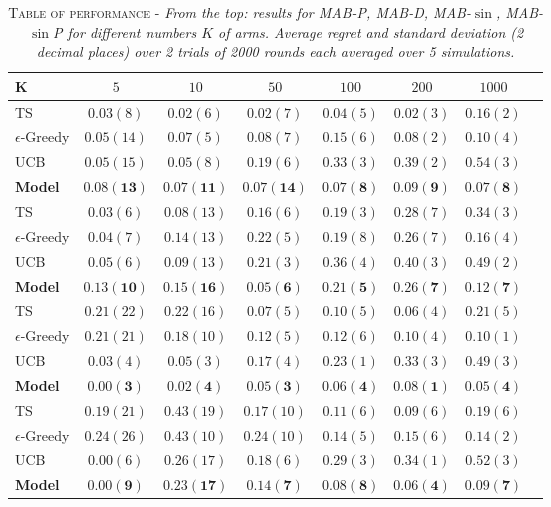 \begin{table}[ht]
\centering
\begin{tabular}{l c c c c c c c}
\toprule
\textbf{K} & \textbf{$5$} & \textbf{$10$} & \textbf{$50$} & \textbf{$100$} & \textbf{$200$} & \textbf{$1000$}\\
\midrule
TS & $0.03(8)$ & $0.02(6)$ & $0.02(7)$ & $0.04(5)$ & $0.02(3)$ & $0.16(2)$ \\
$\epsilon$-Greedy & $0.05(14)$ & $0.07(5)$ & $0.08(7)$ & $0.15(6)$ & $0.08(2)$ & $0.10(4)$ \\
UCB & $0.05(15)$ & $0.05(8)$ & $0.19(6)$ & $0.33(3)$ & $0.39(2)$ & $0.54(3)$ \\
\textbf{Model} & $\mathbf{0.08(13)}$ & $\mathbf{0.07(11)}$ & $\mathbf{0.07(14)}$ & $\mathbf{0.07(8)}$ & $\mathbf{0.09(9)}$ & $\mathbf{0.07(8)}$ \\

\midrule
TS & $0.03(6)$ & $0.08(13)$ & $0.16(6)$ & $0.19(3)$ & $0.28(7)$ & $0.34(3)$ \\
$\epsilon$-Greedy & $0.04(7)$ & $0.14(13)$ & $0.22(5)$ & $0.19(8)$ & $0.26(7)$ & $0.16(4)$ \\
UCB & $0.05(6)$ & $0.09(13)$ & $0.21(3)$ & $0.36(4)$ & $0.40(3)$ & $0.49(2)$ \\
\textbf{Model} & $\mathbf{0.13(10)}$ & $\mathbf{0.15(16)}$ & $\mathbf{0.05(6)}$ & $\mathbf{0.21(5)}$ & $\mathbf{0.26(7)}$ & $\mathbf{0.12(7)}$ \\

\midrule
TS & $0.21(22)$ & $0.22(16)$ & $0.07(5)$ & $0.10(5)$ & $0.06(4)$ & $0.21(5)$ \\
$\epsilon$-Greedy & $0.21(21)$ & $0.18(10)$ & $0.12(5)$ & $0.12(6)$ & $0.10(4)$ & $0.10(1)$ \\
UCB & $0.03(4)$ & $0.05(3)$ & $0.17(4)$ & $0.23(1)$ & $0.33(3)$ & $0.49(3)$ \\
\textbf{Model} & $\mathbf{0.00(3)}$ & $\mathbf{0.02(4)}$ & $\mathbf{0.05(3)}$ & $\mathbf{0.06(4)}$ & $\mathbf{0.08(1)}$ & $\mathbf{0.05(4)}$ \\

\midrule
TS & $0.19(21)$ & $0.43(19)$ & $0.17(10)$ & $0.11(6)$ & $0.09(6)$ & $0.19(6)$ \\
$\epsilon$-Greedy & $0.24(26)$ & $0.43(10)$ & $0.24(10)$ & $0.14(5)$ & $0.15(6)$ & $0.14(2)$ \\
UCB & $0.00(6)$ & $0.26(17)$ & $0.18(6)$ & $0.29(3)$ & $0.34(1)$ & $0.52(3)$ \\
\textbf{Model} & $\mathbf{0.00(9)}$ & $\mathbf{0.23(17)}$ & $\mathbf{0.14(7)}$ & $\mathbf{0.08(8)}$ & $\mathbf{0.06(4)}$ & $\mathbf{0.09(7)}$ \\
\bottomrule
\end{tabular}
\hfill \break
\caption{\textsc{Table of performance} - \textit{From the top: results for MAB-P, MAB-D, MAB-$\sin$, MAB-$\sin$P for different numbers $K$ of arms. Average regret and standard deviation (2 decimal places) over 2 trials of 2000 rounds each averaged over 5 simulations.}}
\end{table}\label{tab:results}



